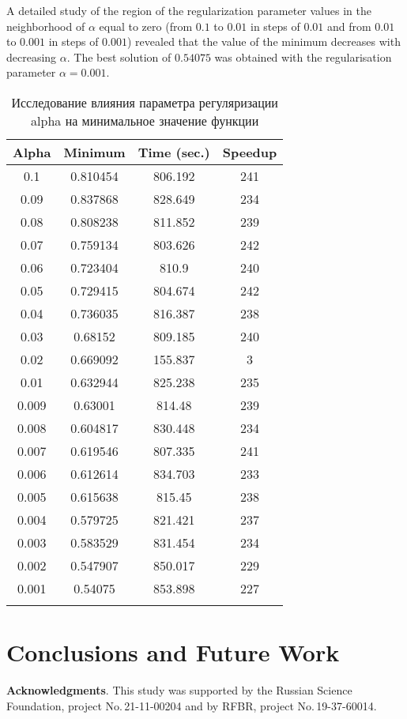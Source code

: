 \documentclass{svproc}
\begin{document}
A detailed study of the region of the regularization parameter values in the neighborhood of $\alpha$ equal to zero (from $0.1$ to $0.01$ in steps of $0.01$ and from $0.01$ to $0.001$ in steps of $0.001$) revealed that the value of the minimum decreases with decreasing $\alpha$. The best solution of $0.54075$ was obtained with the regularisation parameter $\alpha = 0.001$.


\begin{table}
\caption{Исследование влияния параметра регуляризации alpha на минимальное значение функции}
\label{table_1}
\begin{center}
\begin{tabular}{cccc}
\hline\noalign{\smallskip}
 Alpha      & Minimum  & Time (sec.) & Speedup \\
\hline\noalign{\smallskip}
0.1		&	0.810454	&	806.192	&	241       \\
0.09	&	0.837868	&	828.649	&	234       \\
0.08	&	0.808238	&	811.852	&	239       \\
0.07	&	0.759134	&	803.626	&	242       \\
0.06	&	0.723404	&	810.9	&	240       \\
0.05	&	0.729415	&	804.674	&	242       \\
0.04	&	0.736035	&	816.387	&	238       \\
0.03	&	0.68152		&	809.185	&	240       \\
0.02	&	0.669092	&	155.837	&	3         \\
0.01	&	0.632944	&	825.238	&	235       \\
0.009	&	0.63001		&	814.48	&	239       \\
0.008	&	0.604817	&	830.448	&	234       \\
0.007	&	0.619546	&	807.335	&	241       \\
0.006	&	0.612614	&	834.703	&	233       \\
0.005	&	0.615638	&	815.45	&	238       \\
0.004	&	0.579725	&	821.421	&	237       \\
0.003	&	0.583529	&	831.454	&	234       \\
0.002	&	0.547907	&	850.017	&	229       \\
0.001	&	0.54075		&	853.898	&	227       \\
\noalign{\smallskip}\hline
\end{tabular}\end{center}\end{table}



\section{Conclusions and Future Work}



\medskip

\textbf{Acknowledgments}. This study was supported by the Russian Science Foundation, project No.\,21-11-00204 and by RFBR, project No.\,19-37-60014.

%
%

{}
\end{document}
